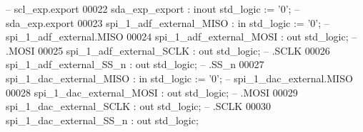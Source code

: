\begin{DoxyCode}
{       --                          scl\_exp.export}
00022         \textcolor{vhdlchar}{sda_exp_export}                          \textcolor{vhdlchar}{:} \textcolor{keywordflow}{inout} \textcolor{comment}{std\_logic}                     \textcolor{vhdlchar}{:=} \textcolor{vhdlchar}{'}\textcolor{vhdllogic}{}\textcolor{vhdllogic}{0}\textcolor{vhdlchar}{'};\textcolor{keyword}{            
       --                          sda\_exp.export}
00023         \textcolor{vhdlchar}{spi_1_adf_external_MISO}                 \textcolor{vhdlchar}{:} \textcolor{keywordflow}{in}    \textcolor{comment}{std\_logic}                     \textcolor{vhdlchar}{:=} \textcolor{vhdlchar}{'}\textcolor{vhdllogic}{}\textcolor{vhdllogic}{0}\textcolor{vhdlchar}{'};\textcolor{keyword}{            
       --               spi\_1\_adf\_external.MISO}
00024         \textcolor{vhdlchar}{spi_1_adf_external_MOSI}                 \textcolor{vhdlchar}{:} \textcolor{keywordflow}{out}   \textcolor{comment}{std\_logic};\textcolor{keyword}{                                       
       --                                 .MOSI}
00025         \textcolor{vhdlchar}{spi_1_adf_external_SCLK}                 \textcolor{vhdlchar}{:} \textcolor{keywordflow}{out}   \textcolor{comment}{std\_logic};\textcolor{keyword}{                                       
       --                                 .SCLK}
00026         \textcolor{vhdlchar}{spi_1_adf_external_SS_n}                 \textcolor{vhdlchar}{:} \textcolor{keywordflow}{out}   \textcolor{comment}{std\_logic};\textcolor{keyword}{                                       
       --                                 .SS\_n}
00027         \textcolor{vhdlchar}{spi_1_dac_external_MISO}                 \textcolor{vhdlchar}{:} \textcolor{keywordflow}{in}    \textcolor{comment}{std\_logic}                     \textcolor{vhdlchar}{:=} \textcolor{vhdlchar}{'}\textcolor{vhdllogic}{}\textcolor{vhdllogic}{0}\textcolor{vhdlchar}{'};\textcolor{keyword}{            
       --               spi\_1\_dac\_external.MISO}
00028         \textcolor{vhdlchar}{spi_1_dac_external_MOSI}                 \textcolor{vhdlchar}{:} \textcolor{keywordflow}{out}   \textcolor{comment}{std\_logic};\textcolor{keyword}{                                       
       --                                 .MOSI}
00029         \textcolor{vhdlchar}{spi_1_dac_external_SCLK}                 \textcolor{vhdlchar}{:} \textcolor{keywordflow}{out}   \textcolor{comment}{std\_logic};\textcolor{keyword}{                                       
       --                                 .SCLK}
00030         \textcolor{vhdlchar}{spi_1_dac_external_SS_n}                 \textcolor{vhdlchar}{:} \textcolor{keywordflow}{out}   \textcolor{comment}{std\_logic};\textcolor{keyword}{                                       
}
\end{DoxyCode}
